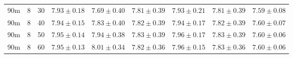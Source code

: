 \begin{table}
\begin{center}
\begin{tabular}{ccc|c|ccccc}
  90m &   8 &  30 & $7.93 \pm 0.18$ & $7.69 \pm 0.40$ & $7.81 \pm 0.39$ & $7.93 \pm 0.21$ & $7.81 \pm 0.39$ & $7.59 \pm 0.08$ \\ 
  90m &   8 &  40 & $7.94 \pm 0.15$ & $7.83 \pm 0.40$ & $7.82 \pm 0.39$ & $7.94 \pm 0.17$ & $7.82 \pm 0.39$ & $7.60 \pm 0.07$ \\ 
  90m &   8 &  50 & $7.95 \pm 0.14$ & $7.94 \pm 0.38$ & $7.83 \pm 0.39$ & $7.96 \pm 0.17$ & $7.83 \pm 0.39$ & $7.60 \pm 0.06$ \\ 
  90m &   8 &  60 & $7.95 \pm 0.13$ & $8.01 \pm 0.34$ & $7.82 \pm 0.36$ & $7.96 \pm 0.15$ & $7.83 \pm 0.36$ & $7.60 \pm 0.06$ \\ 
   \hline
\end{tabular}
\end{center}
\end{table}


